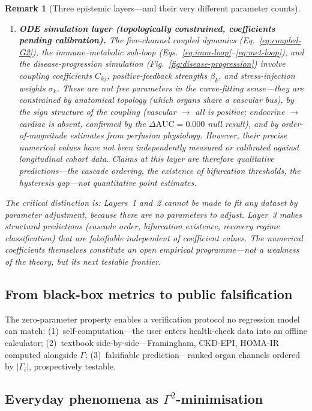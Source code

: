 \documentclass[aps,pre,twocolumn,superscriptaddress,floatfix]{revtex4-2}
\newtheorem{remark}{Remark}
\begin{document}
\begin{remark}[Three epistemic layers---and their
  very different parameter counts]
\begin{enumerate}
  \item \textbf{ODE simulation layer
    (topologically constrained, coefficients
    pending calibration).}
    The five-channel coupled dynamics
    (Eq.~\ref{eq:coupled-G2}), the
    immune--metabolic sub-loop
    (Eqs.~\ref{eq:imm-loop}--\ref{eq:met-loop}),
    and the disease-progression simulation
    (Fig.~\ref{fig:disease-progression}) involve
    coupling coefficients $C_{kj}$,
    positive-feedback strengths $\beta_k$, and
    stress-injection weights $\sigma_k$.
    These are \emph{not} free parameters in
    the curve-fitting sense---they are
    constrained by anatomical topology
    (which organs share a vascular bus),
    by the sign structure of the coupling
    (vascular $\to$ all is positive;
    endocrine $\to$ cardiac is absent,
    confirmed by the $\Delta\text{AUC} = 0.000$
    null result), and by order-of-magnitude
    estimates from perfusion physiology.
    However, their precise numerical values
    have \emph{not} been independently measured
    or calibrated against longitudinal cohort data.
    Claims at this layer are therefore
    \emph{qualitative predictions}---the
    cascade ordering, the existence of
    bifurcation thresholds, the hysteresis
    gap---not quantitative point estimates.
\end{enumerate}
The critical distinction is: Layers~1 and~2
cannot be made to fit any dataset by parameter
adjustment, because there are no parameters to
adjust.
Layer~3 makes structural predictions
(cascade order, bifurcation existence,
recovery regime classification)
that are falsifiable independent of coefficient
values.
The numerical coefficients themselves constitute
an open empirical programme---not a weakness of
the theory, but its next testable frontier.
\end{remark}

\subsection{From black-box metrics to public falsification}

The zero-parameter property enables a verification protocol
no regression model can match: (1)~self-computation---the
user enters health-check data into an offline calculator;
(2)~textbook side-by-side---Framingham, CKD-EPI, HOMA-IR
computed alongside $\Gamma$; (3)~falsifiable
prediction---ranked organ channels ordered by $|\Gamma_i|$,
prospectively testable.

\subsection{Everyday phenomena as $\Gamma^2$-minimisation}
\end{document}

